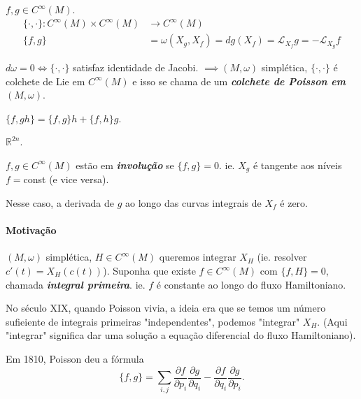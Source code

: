 \begin{defn}
	$f,g\in C^\infty(M)$.
	\begin{align*}
		\{\cdot ,\cdot \}: C^\infty(M)\times C^\infty(M) &\longrightarrow C^\infty(M) \\
		\{f,g\} & =\omega(X_g,X_f)=dg(X_f)=\mathcal{L}_{X_f}g=-\mathcal{L}_{X_g}f 
	\end{align*}
	
\end{defn}

\begin{prop}
	$d\omega=0\iff \{\cdot ,\cdot \}$ satisfaz identidade de Jacobi.  $\implies (M,\omega)$ simpl\'etica, $\{\cdot ,\cdot \}$ \'e colchete de Lie em $C^\infty(M)$ e isso se chama de um \textit{\textbf{colchete de Poisson em $(M,\omega)$}}.
\end{prop}

\begin{exercise}
	$\{f,gh\} =\{f,g\} h+\{f,h\} g$.
\end{exercise}

\begin{example}
	$\mathbb{R}^{2n}$.
\end{example}

\begin{defn}
	$f,g\in C^\infty(M)$ est\~ao em \textit{\textbf{involu\c c\~ao}} se $\{f,g\} =0$. ie. $X_g$ \'e tangente aos n\'iveis $f=$const (e vice versa).
\end{defn}

\begin{remark}
	Nesse caso, a derivada de $g$ ao longo das curvas integrais de $X_f$ \'e zero.
\end{remark}

\paragraph{Motiva\c c\~ao} $(M,\omega)$ simpl\'etica, $H\in C^\infty(M)$ queremos integrar $X_H$ (ie. resolver $c'(t)=X_H(c(t))$). Suponha que existe $f\in C^\infty(M)$ com $\{f,H\} =0$, chamada \textit{\textbf{integral primeira}}. ie.  $f$ \'e constante ao longo do fluxo Hamiltoniano.

No s\'eculo XIX, quando Poisson vivia, a ideia era que se temos um n\'umero sufieiente de integrais primeiras "independentes", podemos "integrar" $X_H$. (Aqui "integrar" significa dar uma solu\c c\~ao a equa\c c\~ao diferencial do fluxo Hamiltoniano).

Em 1810, Poisson deu a f\'ormula
\[\{f,g\} =\sum_{i,j}\frac{\partial f}{\partial p_i}\frac{\partial g}{\partial q_i}-\frac{\partial f}{\partial q_i}\frac{\partial g}{\partial p_i}.\]

